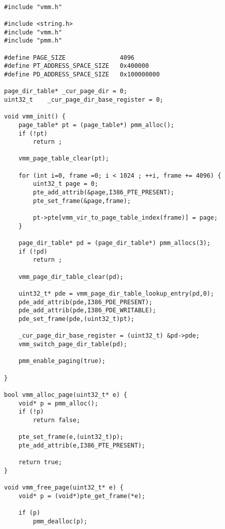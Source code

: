 \documentclass[document.tex]{subfiles}
\begin{document}
\begin{english}

\lstset{numberstyle=\tiny,numbers=left,stepnumber=1,numbersep=5pt,tabsize=2,extendedchars=true,breaklines=true,frame=b,showspaces=false, showtabs=false,xleftmargin=10pt,framexleftmargin=10pt,framexrightmargin=5pt,framexbottommargin=4pt,showstringspaces=false,language=C++}

\begin{lstlisting}[label=lst:vmm.cpp,caption=\en{Virtual Memory Manager Implemetation}]

#include "vmm.h"

#include <string.h>
#include "vmm.h"
#include "pmm.h"

#define PAGE_SIZE 				4096
#define PT_ADDRESS_SPACE_SIZE	0x400000
#define PD_ADDRESS_SPACE_SIZE	0x100000000

page_dir_table* _cur_page_dir = 0;
uint32_t	_cur_page_dir_base_register = 0;

void vmm_init() {
	page_table* pt = (page_table*) pmm_alloc();
	if (!pt)
		return ;
	
	vmm_page_table_clear(pt);
	
	for (int i=0, frame =0; i < 1024 ; ++i, frame += 4096) {
		uint32_t page = 0;
		pte_add_attrib(&page,I386_PTE_PRESENT);
		pte_set_frame(&page,frame);
		
		pt->pte[vmm_vir_to_page_table_index(frame)] = page;
	}
	
	page_dir_table* pd = (page_dir_table*) pmm_allocs(3);
	if (!pd)
		return ;
		
	vmm_page_dir_table_clear(pd);
	
	uint32_t* pde = vmm_page_dir_table_lookup_entry(pd,0);
	pde_add_attrib(pde,I386_PDE_PRESENT);
	pde_add_attrib(pde,I386_PDE_WRITABLE);
	pde_set_frame(pde,(uint32_t)pt);
	
	_cur_page_dir_base_register = (uint32_t) &pd->pde;
	vmm_switch_page_dir_table(pd);
	
	pmm_enable_paging(true);
	
}

bool vmm_alloc_page(uint32_t* e) {
	void* p = pmm_alloc();
	if (!p)
		return false;
	
	pte_set_frame(e,(uint32_t)p);
	pte_add_attrib(e,I386_PTE_PRESENT);
	
	return true;
}

void vmm_free_page(uint32_t* e) {
	void* p = (void*)pte_get_frame(*e);
	
	if (p)
		pmm_dealloc(p);
		

\end{lstlisting}
\end{english}
\end{document}
